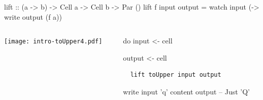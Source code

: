\documentclass[UKenglish,usenames,dvipsnames,svgnames,table,aspectratio=169,mathserif]{beamer}
\newcommand{\nl}{\vspace{\baselineskip}}
\begin{document}
\begin{frame}[fragile]
\begin{haskellcode}
          lift :: (a -> b) -> Cell a -> Cell b -> Par ()
          lift f input output =
            watch input (\a ->
              write output (f a))
\end{haskellcode}
\end{frame}


\begin{frame}[fragile]
\centering

\begin{columns}
\begin{column}{0.5\textwidth}
\begin{overlayarea}{0.5\textwidth}{0.4\textheight}
\texttt{[image: intro-toUpper4.pdf]}
\end{overlayarea}
\end{column}
\begin{column}{0.5\textwidth}
\begin{haskellcode}
do
  input  <- cell
\end{haskellcode}
\begin{haskellcode}
  output <- cell
\end{haskellcode}
\begin{verbatim}
  lift toUpper input output
\end{verbatim}
\nl
\begin{haskellcode}
  write input 'q'
  content output   -- Just 'Q'
\end{haskellcode}
\end{column}
\end{columns}

\end{frame}
\end{document}
